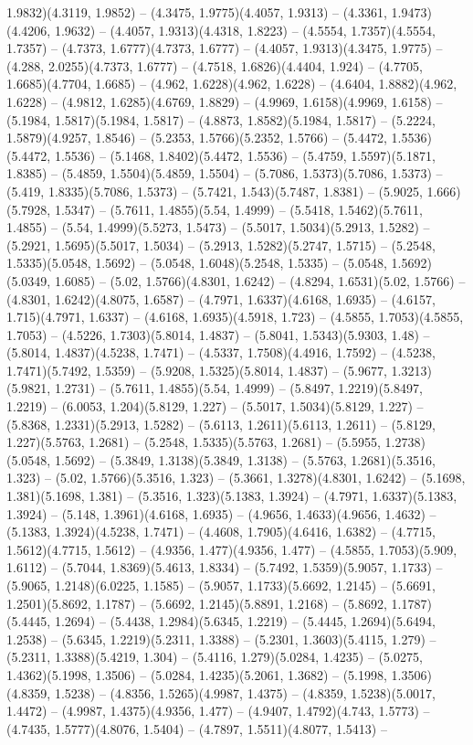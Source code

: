 1.9832)(4.3119, 1.9852) -- (4.3475, 1.9775)(4.4057, 1.9313) -- (4.3361, 1.9473)(4.4206, 1.9632) -- (4.4057, 1.9313)(4.4318, 1.8223) -- (4.5554, 1.7357)(4.5554, 1.7357) -- (4.7373, 1.6777)(4.7373, 1.6777) -- (4.4057, 1.9313)(4.3475, 1.9775) -- (4.288, 2.0255)(4.7373, 1.6777) -- (4.7518, 1.6826)(4.4404, 1.924) -- (4.7705, 1.6685)(4.7704, 1.6685) -- (4.962, 1.6228)(4.962, 1.6228) -- (4.6404, 1.8882)(4.962, 1.6228) -- (4.9812, 1.6285)(4.6769, 1.8829) -- (4.9969, 1.6158)(4.9969, 1.6158) -- (5.1984, 1.5817)(5.1984, 1.5817) -- (4.8873, 1.8582)(5.1984, 1.5817) -- (5.2224, 1.5879)(4.9257, 1.8546) -- (5.2353, 1.5766)(5.2352, 1.5766) -- (5.4472, 1.5536)(5.4472, 1.5536) -- (5.1468, 1.8402)(5.4472, 1.5536) -- (5.4759, 1.5597)(5.1871, 1.8385) -- (5.4859, 1.5504)(5.4859, 1.5504) -- (5.7086, 1.5373)(5.7086, 1.5373) -- (5.419, 1.8335)(5.7086, 1.5373) -- (5.7421, 1.543)(5.7487, 1.8381) -- (5.9025, 1.666)(5.7928, 1.5347) -- (5.7611, 1.4855)(5.54, 1.4999) -- (5.5418, 1.5462)(5.7611, 1.4855) -- (5.54, 1.4999)(5.5273, 1.5473) -- (5.5017, 1.5034)(5.2913, 1.5282) -- (5.2921, 1.5695)(5.5017, 1.5034) -- (5.2913, 1.5282)(5.2747, 1.5715) -- (5.2548, 1.5335)(5.0548, 1.5692) -- (5.0548, 1.6048)(5.2548, 1.5335) -- (5.0548, 1.5692)(5.0349, 1.6085) -- (5.02, 1.5766)(4.8301, 1.6242) -- (4.8294, 1.6531)(5.02, 1.5766) -- (4.8301, 1.6242)(4.8075, 1.6587) -- (4.7971, 1.6337)(4.6168, 1.6935) -- (4.6157, 1.715)(4.7971, 1.6337) -- (4.6168, 1.6935)(4.5918, 1.723) -- (4.5855, 1.7053)(4.5855, 1.7053) -- (4.5226, 1.7303)(5.8014, 1.4837) -- (5.8041, 1.5343)(5.9303, 1.48) -- (5.8014, 1.4837)(4.5238, 1.7471) -- (4.5337, 1.7508)(4.4916, 1.7592) -- (4.5238, 1.7471)(5.7492, 1.5359) -- (5.9208, 1.5325)(5.8014, 1.4837) -- (5.9677, 1.3213)(5.9821, 1.2731) -- (5.7611, 1.4855)(5.54, 1.4999) -- (5.8497, 1.2219)(5.8497, 1.2219) -- (6.0053, 1.204)(5.8129, 1.227) -- (5.5017, 1.5034)(5.8129, 1.227) -- (5.8368, 1.2331)(5.2913, 1.5282) -- (5.6113, 1.2611)(5.6113, 1.2611) -- (5.8129, 1.227)(5.5763, 1.2681) -- (5.2548, 1.5335)(5.5763, 1.2681) -- (5.5955, 1.2738)(5.0548, 1.5692) -- (5.3849, 1.3138)(5.3849, 1.3138) -- (5.5763, 1.2681)(5.3516, 1.323) -- (5.02, 1.5766)(5.3516, 1.323) -- (5.3661, 1.3278)(4.8301, 1.6242) -- (5.1698, 1.381)(5.1698, 1.381) -- (5.3516, 1.323)(5.1383, 1.3924) -- (4.7971, 1.6337)(5.1383, 1.3924) -- (5.148, 1.3961)(4.6168, 1.6935) -- (4.9656, 1.4633)(4.9656, 1.4632) -- (5.1383, 1.3924)(4.5238, 1.7471) -- (4.4608, 1.7905)(4.6416, 1.6382) -- (4.7715, 1.5612)(4.7715, 1.5612) -- (4.9356, 1.477)(4.9356, 1.477) -- (4.5855, 1.7053)(5.909, 1.6112) -- (5.7044, 1.8369)(5.4613, 1.8334) -- (5.7492, 1.5359)(5.9057, 1.1733) -- (5.9065, 1.2148)(6.0225, 1.1585) -- (5.9057, 1.1733)(5.6692, 1.2145) -- (5.6691, 1.2501)(5.8692, 1.1787) -- (5.6692, 1.2145)(5.8891, 1.2168) -- (5.8692, 1.1787)(5.4445, 1.2694) -- (5.4438, 1.2984)(5.6345, 1.2219) -- (5.4445, 1.2694)(5.6494, 1.2538) -- (5.6345, 1.2219)(5.2311, 1.3388) -- (5.2301, 1.3603)(5.4115, 1.279) -- (5.2311, 1.3388)(5.4219, 1.304) -- (5.4116, 1.279)(5.0284, 1.4235) -- (5.0275, 1.4362)(5.1998, 1.3506) -- (5.0284, 1.4235)(5.2061, 1.3682) -- (5.1998, 1.3506)(4.8359, 1.5238) -- (4.8356, 1.5265)(4.9987, 1.4375) -- (4.8359, 1.5238)(5.0017, 1.4472) -- (4.9987, 1.4375)(4.9356, 1.477) -- (4.9407, 1.4792)(4.743, 1.5773) -- (4.7435, 1.5777)(4.8076, 1.5404) -- (4.7897, 1.5511)(4.8077, 1.5413) -- 